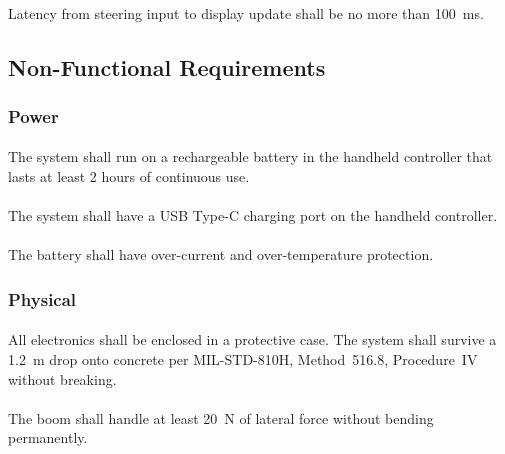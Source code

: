 \paragraph{}
Latency from steering input to display update shall be no more than 100~ms.

\subsection{Non-Functional Requirements}

\subsubsection{Power}

\paragraph{} \label{battery}
The system shall run on a rechargeable battery in the handheld controller that lasts at least 2 hours of continuous use.

\paragraph{}
The system shall have a USB Type-C charging port on the handheld controller.

\paragraph{}
The battery shall have over-current and over-temperature protection.

\subsubsection{Physical}

\paragraph{} \label{drop}
All electronics shall be enclosed in a protective case.  The system shall survive a 1.2~m drop onto concrete per MIL-STD-810H, Method~516.8, Procedure~IV without breaking.

\paragraph{}
The boom shall handle at least 20~N of lateral force without bending permanently.

